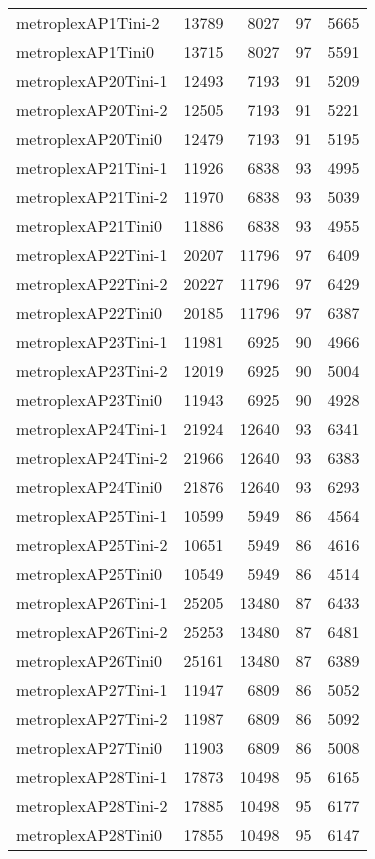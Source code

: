 \begin{longtable}{lrrrr}
metroplexAP1Tini-2 & 13789 & 8027 & 97 & 5665 \\
metroplexAP1Tini0 & 13715 & 8027 & 97 & 5591 \\
metroplexAP20Tini-1 & 12493 & 7193 & 91 & 5209 \\
metroplexAP20Tini-2 & 12505 & 7193 & 91 & 5221 \\
metroplexAP20Tini0 & 12479 & 7193 & 91 & 5195 \\
metroplexAP21Tini-1 & 11926 & 6838 & 93 & 4995 \\
metroplexAP21Tini-2 & 11970 & 6838 & 93 & 5039 \\
metroplexAP21Tini0 & 11886 & 6838 & 93 & 4955 \\
metroplexAP22Tini-1 & 20207 & 11796 & 97 & 6409 \\
metroplexAP22Tini-2 & 20227 & 11796 & 97 & 6429 \\
metroplexAP22Tini0 & 20185 & 11796 & 97 & 6387 \\
metroplexAP23Tini-1 & 11981 & 6925 & 90 & 4966 \\
metroplexAP23Tini-2 & 12019 & 6925 & 90 & 5004 \\
metroplexAP23Tini0 & 11943 & 6925 & 90 & 4928 \\
metroplexAP24Tini-1 & 21924 & 12640 & 93 & 6341 \\
metroplexAP24Tini-2 & 21966 & 12640 & 93 & 6383 \\
metroplexAP24Tini0 & 21876 & 12640 & 93 & 6293 \\
metroplexAP25Tini-1 & 10599 & 5949 & 86 & 4564 \\
metroplexAP25Tini-2 & 10651 & 5949 & 86 & 4616 \\
metroplexAP25Tini0 & 10549 & 5949 & 86 & 4514 \\
metroplexAP26Tini-1 & 25205 & 13480 & 87 & 6433 \\
metroplexAP26Tini-2 & 25253 & 13480 & 87 & 6481 \\
metroplexAP26Tini0 & 25161 & 13480 & 87 & 6389 \\
metroplexAP27Tini-1 & 11947 & 6809 & 86 & 5052 \\
metroplexAP27Tini-2 & 11987 & 6809 & 86 & 5092 \\
metroplexAP27Tini0 & 11903 & 6809 & 86 & 5008 \\
metroplexAP28Tini-1 & 17873 & 10498 & 95 & 6165 \\
metroplexAP28Tini-2 & 17885 & 10498 & 95 & 6177 \\
metroplexAP28Tini0 & 17855 & 10498 & 95 & 6147 \\

\end{longtable}
